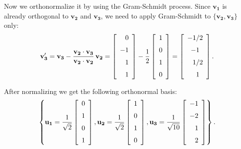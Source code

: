 \documentclass[12pt]{article}
\begin{document}
{Now we orthonormalize it by using the Gram-Schmidt process.
Since $\mathbf{v_1}$ is already orthogonal to $\mathbf{v_2}$ 
and $\mathbf{v_3}$, we need to apply Gram-Schmidt to 
$\{\mathbf{v_2},\mathbf{v_3}\}$ only: 
\[
\mathbf{v'_3} = \mathbf{v_3} - 
\frac{\mathbf{v_2}\cdot\mathbf{v_3}}{\mathbf{v_2}\cdot\mathbf{v_2}}
\,\mathbf{v_2}
=
\left [\begin {array}{r} 0\\\noalign{\medskip}-1\\\noalign{\medskip}1
\\\noalign{\medskip}1\end {array}\right ]
-
\frac{1}{2}
\left [\begin {array}{r} 1\\\noalign{\medskip}0\\\noalign{\medskip}1
\\\noalign{\medskip}0\end {array}\right ]
=
\left [\begin {array}{c} -1/2\\\noalign{\medskip}-1
\\\noalign{\medskip}\phantom{-}1/2
\\\noalign{\medskip}\phantom{-}1\end {array}\right ].
\]

After normalizing we get the following orthonormal basis:
\[
\left\{
\mathbf{u_1} =
\frac{1}{\sqrt{2}} 
\left [\begin {array}{r} 0\\\noalign{\medskip}1\\\noalign{\medskip}0
\\\noalign{\medskip}1\end {array}\right ],
\mathbf{u_2} =
\frac{1}{\sqrt{2}} 
\left [\begin {array}{r} 1\\\noalign{\medskip}0\\\noalign{\medskip}1
\\\noalign{\medskip}0\end {array}\right ],
\mathbf{u_3} = 
\frac{1}{\sqrt{10}} 
\left [\begin {array}{c} -1\\\noalign{\medskip}-2
\\\noalign{\medskip}\phantom{-}1
\\\noalign{\medskip}\phantom{-}2\end {array}\right ]
\right\}.
\]


}


\clearpage
\end{document}
